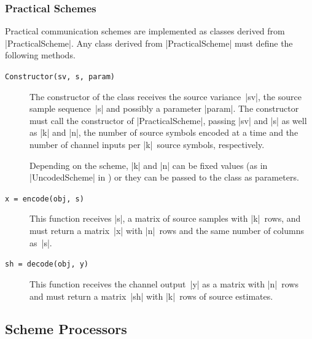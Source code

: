 \subsubsection{Practical Schemes}

Practical communication schemes are implemented as classes derived from
|PracticalScheme|. Any class derived from |PracticalScheme| must define the
following methods.
\begin{description}
  \item[\texttt{Constructor(sv, s, param)}] The constructor of the class
    receives the source variance~|sv|, the source sample sequence~|s| and
    possibly a parameter |param|. The constructor must call the constructor of
    |PracticalScheme|, passing |sv| and |s| as well as |k| and |n|, the number
    of source symbols encoded at a time and the number of channel inputs per
    |k|~source symbols, respectively. 

    Depending on the scheme, |k| and |n| can be fixed values (as in
    |UncodedScheme| in ) or they can be passed to the class as
    parameters.

  \item[\texttt{x = encode(obj, s)}] This function receives |s|, a matrix of
    source samples with |k|~rows, and must return a matrix~|x| with |n|~rows and
    the same number of columns as~|s|.

  \item[\texttt{sh = decode(obj, y)}] This function receives the channel
    output~|y| as a matrix with |n|~rows and must return a matrix~|sh| with
    |k|~rows of source estimates.
\end{description}


\subsection{Scheme Processors}

